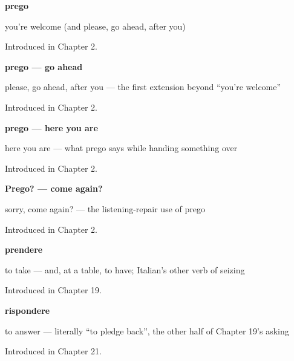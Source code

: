 \noindent\begin{minipage}[t]{\linewidth}
\raggedright
\textbf{prego}\par
\small you're welcome (and please, go ahead, after you)\par
\footnotesize Introduced in Chapter 2.
\end{minipage}\par\medskip

\noindent\begin{minipage}[t]{\linewidth}
\raggedright
\textbf{prego — go ahead}\par
\small please, go ahead, after you — the first extension beyond \textquotedblleft{}you're welcome\textquotedblright{}\par
\footnotesize Introduced in Chapter 2.
\end{minipage}\par\medskip

\noindent\begin{minipage}[t]{\linewidth}
\raggedright
\textbf{prego — here you are}\par
\small here you are — what prego says while handing something over\par
\footnotesize Introduced in Chapter 2.
\end{minipage}\par\medskip

\noindent\begin{minipage}[t]{\linewidth}
\raggedright
\textbf{Prego? — come again?}\par
\small sorry, come again? — the listening-repair use of prego\par
\footnotesize Introduced in Chapter 2.
\end{minipage}\par\medskip

\noindent\begin{minipage}[t]{\linewidth}
\raggedright
\textbf{prendere}\par
\small to take — and, at a table, to have; Italian's other verb of seizing\par
\footnotesize Introduced in Chapter 19.
\end{minipage}\par\medskip

\noindent\begin{minipage}[t]{\linewidth}
\raggedright
\textbf{rispondere}\par
\small to answer — literally \textquotedblleft{}to pledge back\textquotedblright{}, the other half of Chapter 19's asking\par
\footnotesize Introduced in Chapter 21.
\end{minipage}\par\medskip

